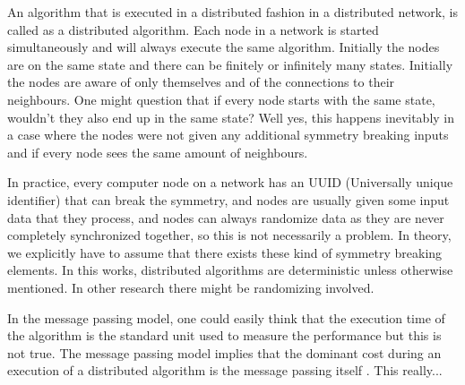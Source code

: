 An algorithm that is executed in a distributed fashion in a distributed network, is called as a distributed algorithm.
Each node in a network is started simultaneously and will always execute the same algorithm.
Initially the nodes are on the same state and there can be finitely or infinitely many states.
Initially the nodes are aware of only themselves and of the connections to their neighbours.
One might question that if every node starts with the same state, wouldn't they also end up in the same state?
Well yes, this happens inevitably in a case where the nodes were not given any additional symmetry breaking inputs and if every node sees the same amount of neighbours.
\cite{HirvonenSuomelaDistAlg2020}



In practice, every computer node on a network has an UUID (Universally unique identifier) that can break the symmetry, and nodes are usually given some input data that they process, and nodes can always randomize data as they are never completely synchronized together, so this is not necessarily a problem.
In theory, we explicitly have to assume that there exists these kind of symmetry breaking elements.
In this works, distributed algorithms are deterministic unless otherwise mentioned.
In other research there might be randomizing involved.


In the message passing model, one could easily think that the execution time of the algorithm is the standard unit used to measure the performance but this is not true.
The message passing model implies that the dominant cost during an execution of a distributed algorithm is the message passing itself
\cite{DBLP:books/el/leeuwen90/LamportL90}.
This really... 






